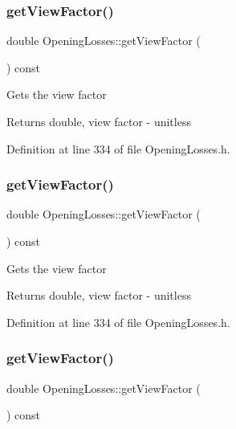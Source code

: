 \subsubsection{\texorpdfstring{get\+View\+Factor()}{getViewFactor()}\hspace{0.1cm}{\footnotesize\ttfamily [1/3]}}
{\footnotesize\ttfamily double Opening\+Losses\+::get\+View\+Factor (\begin{DoxyParamCaption}{ }\end{DoxyParamCaption}) const\hspace{0.3cm}{\ttfamily [inline]}}

Gets the view factor

\begin{DoxyReturn}{Returns}
double, view factor -\/ unitless 
\end{DoxyReturn}


Definition at line 334 of file Opening\+Losses.\+h.

\mbox{\label{class_opening_losses_ae6633fab7a941e00b9770bee6a3af34d}} 
\subsubsection{\texorpdfstring{get\+View\+Factor()}{getViewFactor()}\hspace{0.1cm}{\footnotesize\ttfamily [2/3]}}
{\footnotesize\ttfamily double Opening\+Losses\+::get\+View\+Factor (\begin{DoxyParamCaption}{ }\end{DoxyParamCaption}) const\hspace{0.3cm}{\ttfamily [inline]}}

Gets the view factor

\begin{DoxyReturn}{Returns}
double, view factor -\/ unitless 
\end{DoxyReturn}


Definition at line 334 of file Opening\+Losses.\+h.

\mbox{\label{class_opening_losses_ae6633fab7a941e00b9770bee6a3af34d}} 
\subsubsection{\texorpdfstring{get\+View\+Factor()}{getViewFactor()}\hspace{0.1cm}{\footnotesize\ttfamily [3/3]}}
{\footnotesize\ttfamily double Opening\+Losses\+::get\+View\+Factor (\begin{DoxyParamCaption}{ }\end{DoxyParamCaption}) const\hspace{0.3cm}{\ttfamily [inline]}}

